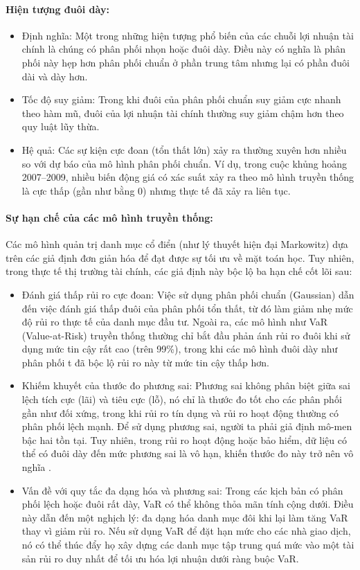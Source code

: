 \paragraph{Hiện tượng đuôi dày:}
\begin{itemize}
    \item Định nghĩa: Một trong những hiện tượng phổ biến của các chuỗi lợi nhuận tài chính là chúng có phân phối nhọn hoặc đuôi dày. Điều này có nghĩa là phân phối này hẹp hơn phân phối chuẩn ở phần trung tâm nhưng lại có phần đuôi dài và dày hơn.
    \item Tốc độ suy giảm: Trong khi đuôi của phân phối chuẩn suy giảm cực nhanh theo hàm mũ, đuôi của lợi nhuận tài chính thường suy giảm chậm hơn theo quy luật lũy thừa.
    \item Hệ quả: Các sự kiện cực đoan (tổn thất lớn) xảy ra thường xuyên hơn nhiều so với dự báo của mô hình phân phối chuẩn. Ví dụ, trong cuộc khủng hoảng 2007–2009, nhiều biến động giá có xác suất xảy ra theo mô hình truyền thống là cực thấp (gần như bằng 0) nhưng thực tế đã xảy ra liên tục.
\end{itemize}

\paragraph{Sự hạn chế của các mô hình truyền thống:}
Các mô hình quản trị danh mục cổ điển (như lý thuyết hiện đại Markowitz) dựa trên các giả định đơn giản hóa để đạt được sự tối ưu về mặt toán học. Tuy nhiên, trong thực tế thị trường tài chính, các giả định này bộc lộ ba hạn chế cốt lõi sau:
\begin{itemize}
    \item Đánh giá thấp rủi ro cực đoan: Việc sử dụng phân phối chuẩn (Gaussian) dẫn đến việc đánh giá thấp đuôi của phân phối tổn thất, từ đó làm giảm nhẹ mức độ rủi ro thực tế của danh mục đầu tư. Ngoài ra, các mô hình như VaR (Value-at-Risk) truyền thống thường chỉ bắt đầu phản ánh rủi ro đuôi khi sử dụng mức tin cậy rất cao (trên 99\%), trong khi các mô hình đuôi dày như phân phối t đã bộc lộ rủi ro này từ mức tin cậy thấp hơn.
    \item Khiếm khuyết của thước đo phương sai: Phương sai không phân biệt giữa sai lệch tích cực (lãi) và tiêu cực (lỗ), nó chỉ là thước đo tốt cho các phân phối gần như đối xứng, trong khi rủi ro tín dụng và rủi ro hoạt động thường có phân phối lệch mạnh. Để sử dụng phương sai, người ta phải giả định mô-men bậc hai tồn tại. Tuy nhiên, trong rủi ro hoạt động hoặc bảo hiểm, dữ liệu có thể có đuôi dày đến mức phương sai là vô hạn, khiến thước đo này trở nên vô nghĩa \cite{klugman1999fitting}.
    \item Vấn đề với quy tắc đa dạng hóa và phương sai: Trong các kịch bản có phân phối lệch hoặc đuôi rất dày, VaR có thể không thỏa mãn tính cộng dưới. Điều này dẫn đến một nghịch lý: đa dạng hóa danh mục đôi khi lại làm tăng VaR thay vì giảm rủi ro. Nếu sử dụng VaR để đặt hạn mức cho các nhà giao dịch, nó có thể thúc đẩy họ xây dựng các danh mục tập trung quá mức vào một tài sản rủi ro duy nhất để tối ưu hóa lợi nhuận dưới ràng buộc VaR.
\end{itemize}

